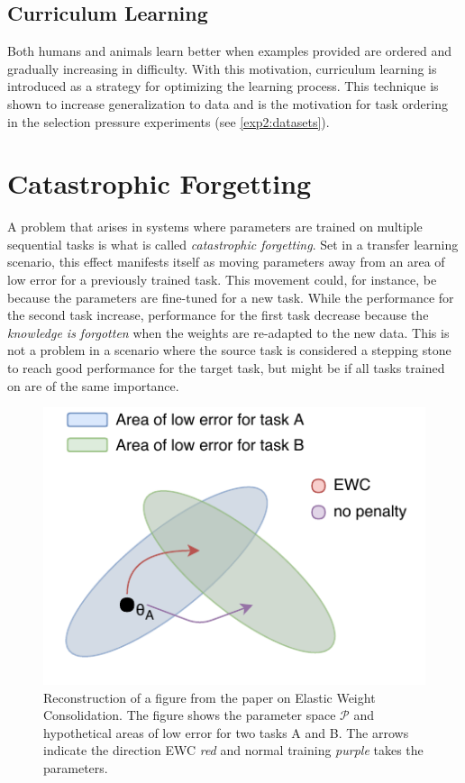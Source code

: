 \subsection{Curriculum Learning}
Both humans and animals learn better when examples provided are ordered and gradually increasing in difficulty. With this motivation, curriculum learning is introduced as a strategy for optimizing the learning process. This technique is shown to increase generalization to data\cite{curriculumlearning} and is the motivation for task ordering in the selection pressure experiments (see \ref{exp2:datasets}).

\section{Catastrophic Forgetting}
\label{background:catastrophicforgetting}
A problem that arises in systems where parameters are trained on multiple sequential tasks is what is called \textit{catastrophic forgetting}. Set in a transfer learning scenario, this effect manifests itself as moving parameters away from an area of low error for a previously trained task. This movement could, for instance, be because the parameters are fine-tuned for a new task. While the performance for the second task increase, performance for the first task decrease because the \textit{knowledge is forgotten} when the weights are re-adapted to the new data. This is not a problem in a scenario where the source task is considered a stepping stone to reach good performance for the target task, but might be if all tasks trained on are of the same importance.

\begin{figure}[ht]
    \centering
    \includegraphics[width=0.7\linewidth]{Chapters/2.Background/figures/EWC.pdf}
    \caption[Elastic Weight Consolidation]{Reconstruction of a figure from the paper on Elastic Weight Consolidation\cite{ewc}. The figure shows the parameter space \(\mathcal{P}\) and hypothetical areas of low error for two tasks A and B. The arrows indicate the direction EWC \textit{red} and normal training \textit{purple} takes the parameters.}
    \label{fig:ewc}
\end{figure}

